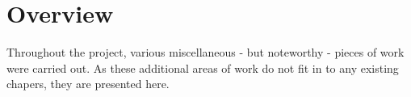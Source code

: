 \section{Overview}
Throughout the project, various miscellaneous - but noteworthy - pieces of work
were carried out. As these additional areas of work do not fit in to any
existing chapers, they are presented here.
